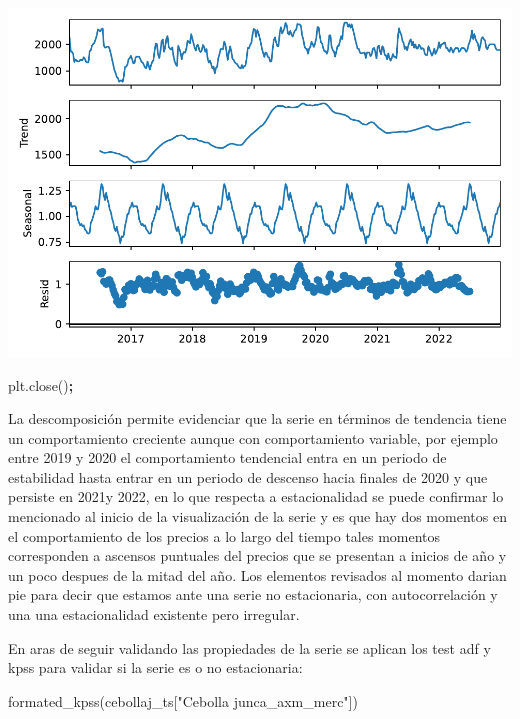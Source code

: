 \documentclass[
]{book}
\newenvironment{Shaded}{\begin{snugshade}}{\end{snugshade}}
\newcommand{\NormalTok}[1]{#1}
\newcommand{\OperatorTok}[1]{\textcolor[rgb]{0.81,0.36,0.00}{\textbf{#1}}}
\newcommand{\StringTok}[1]{\textcolor[rgb]{0.31,0.60,0.02}{#1}}
\begin{document}
\includegraphics{bookdown-demo_files/figure-latex/unnamed-chunk-58-21.pdf}

\begin{Shaded}
\begin{Highlighting}[]
\NormalTok{plt.close()}\OperatorTok{;}
\end{Highlighting}
\end{Shaded}

La descomposición permite evidenciar que la serie en términos de tendencia tiene un comportamiento creciente aunque con comportamiento variable, por ejemplo entre 2019 y 2020 el comportamiento tendencial entra en un periodo de estabilidad hasta entrar en un periodo de descenso hacia finales de 2020 y que persiste en 2021y 2022, en lo que respecta a estacionalidad se puede confirmar lo mencionado al inicio de la visualización de la serie y es que hay dos momentos en el comportamiento de los precios a lo largo del tiempo tales momentos corresponden a ascensos puntuales del precios que se presentan a inicios de año y un poco despues de la mitad del año. Los elementos revisados al momento darian pie para decir que estamos ante una serie no estacionaria, con autocorrelación y una una estacionalidad existente pero irregular.

En aras de seguir validando las propiedades de la serie se aplican los test adf y kpss para validar si la serie es o no estacionaria:

\begin{Shaded}
\begin{Highlighting}[]


\NormalTok{formated\_kpss(cebollaj\_ts[}\StringTok{"Cebolla junca\_axm\_merc"}\NormalTok{])}
\end{Highlighting}
\end{Shaded}
\end{document}
